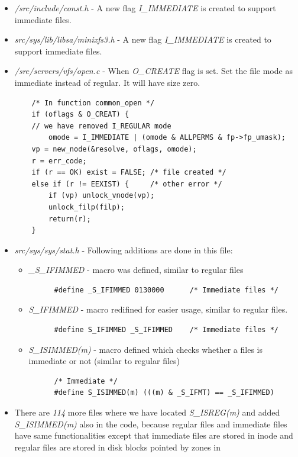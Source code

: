 \begin{itemize}
  \item \emph{/src/include/const.h} - A new flag \emph{I\_IMMEDIATE} is created
  to support immediate files.
  \item \emph{src/sys/lib/libsa/minixfs3.h} - A new flag \emph{I\_IMMEDIATE} is created
  to support immediate files.
  \item \emph{/src/servers/vfs/open.c} - When \emph{O\_CREATE} flag is set. Set
  the file mode as immediate instead of regular. It will have size zero.
  \begin{lstlisting}
  	/* In function common_open */
	if (oflags & O_CREAT) {
	// we have removed I_REGULAR mode
        omode = I_IMMEDIATE | (omode & ALLPERMS & fp->fp_umask);
	vp = new_node(&resolve, oflags, omode);
	r = err_code;
	if (r == OK) exist = FALSE;	/* file created */
	else if (r != EEXIST) {		/* other error */
		if (vp) unlock_vnode(vp);
		unlock_filp(filp);
		return(r);
	}
  \end{lstlisting}
\item \emph{src/sys/sys/stat.h} - Following additions are done in this file:
	\begin{itemize}
	  \item \emph{\_S\_IFIMMED} - macro was defined, similar to regular files
	  \begin{lstlisting}
	  #define _S_IFIMMED 0130000      /* Immediate files */	
  	  \end{lstlisting}
  	  \item \emph{S\_IFIMMED} - macro redifined for easier usage, similar to
  	  regular files.
  	  \begin{lstlisting}
	  #define S_IFIMMED _S_IFIMMED    /* Immediate files */	
  	  \end{lstlisting}
  	  \item \emph{S\_ISIMMED(m)} - macro defined which checks whether a files is
  	  immediate or not (similar to regular files)
  	  \begin{lstlisting}
  	  /* Immediate */
	  #define S_ISIMMED(m) (((m) & _S_IFMT) == _S_IFIMMED) 	
  	  \end{lstlisting}
	\end{itemize}
\item There are \emph{114} more files where we have located \emph{S\_ISREG(m)}
and added \emph{S\_ISIMMED(m)} also in the code, because regular files and
immediate files have same functionalities except that immediate files are
stored in inode and regular files are stored in disk blocks pointed by zones in

\end{itemize}
